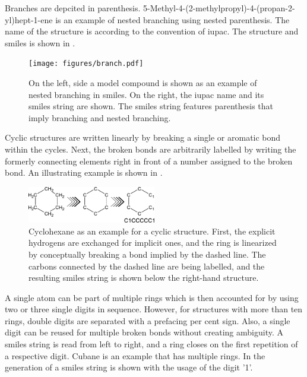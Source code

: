 Branches are depcited in parenthesis. 5-Methyl-4-(2-methylpropyl)-4-(propan-2-yl)hept-1-ene is an example of nested branching using nested parenthesis. The name of the structure is according to the convention of \ac{iupac}\cite{2014a}. The structure and \ac{smiles} is shown in .
\begin{figure}[H]
	\centering
	\texttt{[image: figures/branch.pdf]}
	\caption[Demonstration of a Branching Structure with SMILES]{On the left, side a model compound is shown as an example of nested branching in \ac{smiles}. On the right, the \ac{iupac} name and its \ac{smiles} string are shown. The \ac{smiles} string features parenthesis that imply branching and nested branching.\cite{Weininger1988}}
	\label{fig:branching}
\end{figure}\noindent
Cyclic structures are written linearly by breaking a single or aromatic bond within the cycles. Next, the broken bonds are arbitrarily labelled by writing the formerly connecting elements right in front of a number assigned to the broken bond. An illustrating example is shown in .
\begin{figure}[H]
	\centering
	\includegraphics[width=0.5\textwidth]{figures/cycle.pdf}
	\caption[SMILES string of a Cyclic Structure]{Cyclohexane as an example for a cyclic structure. First, the explicit hydrogens are exchanged for implicit ones, and the ring is linearized by conceptually breaking a bond implied by the dashed line. The carbons connected by the dashed line are being labelled, and the resulting \ac{smiles} string is shown below the right-hand structure.\cite{Weininger1988}}
	\label{fig:cycle}
\end{figure}\noindent
A single atom can be part of multiple rings which is then accounted for by using two or three single digits in sequence. However, for structures with more than ten rings, double digits are separated with a prefacing per cent sign. Also, a single digit can be reused for multiple broken bonds without creating ambiguity. A \ac{smiles} string is read from left to right, and a ring closes on the first repetition of a respective digit. Cubane is an example that has multiple rings. In  the generation of a \ac{smiles} string is shown with the usage of the digit '1'. \cite{Weininger1988}
